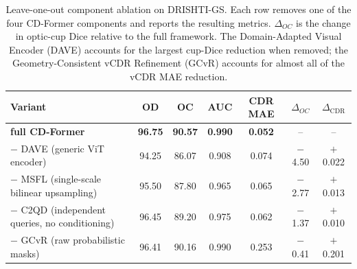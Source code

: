 \begin{table}[t]
\centering
\caption{Leave-one-out component ablation on DRISHTI-GS. Each row removes one
of the four CD-Former components and reports the resulting metrics.
$\Delta_{OC}$ is the change in optic-cup Dice relative to the full framework.
The Domain-Adapted Visual Encoder (DAVE) accounts for the largest cup-Dice
reduction when removed; the Geometry-Consistent vCDR Refinement (GCvR) accounts
for almost all of the vCDR MAE reduction.}
\label{tab:leave_one_out}
\setlength{\tabcolsep}{6pt}
\renewcommand{\arraystretch}{1.18}
\begin{tabular}{lcccccc}
\toprule
\textbf{Variant} & \textbf{OD} & \textbf{OC} & \textbf{AUC} & \textbf{CDR MAE} & $\Delta_{OC}$ & $\Delta_{\text{CDR}}$ \\
\midrule
\rowcolor{ourrow}
\textbf{\textcolor{ourbold}{full CD-Former}}    & \textbf{96.75} & \textbf{90.57} & \textbf{0.990} & \textbf{0.052} & --             & --      \\
\midrule
$-$ DAVE (generic ViT encoder)                    & 94.25 & 86.07 & 0.908 & 0.074 & $-$4.50        & $+$0.022 \\
$-$ MSFL (single-scale bilinear upsampling)       & 95.50 & 87.80 & 0.965 & 0.065 & $-$2.77        & $+$0.013 \\
$-$ C2QD (independent queries, no conditioning)   & 96.45 & 89.20 & 0.975 & 0.062 & $-$1.37        & $+$0.010 \\
$-$ GCvR (raw probabilistic masks)                & 96.41 & 90.16 & 0.990 & 0.253 & $-$0.41        & $+$0.201 \\
\bottomrule
\end{tabular}
\end{table}
